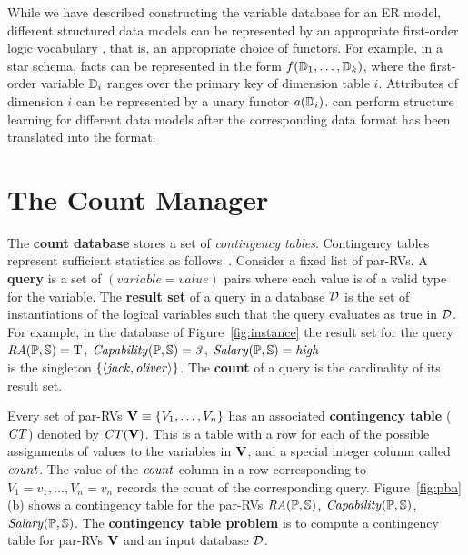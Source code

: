 \documentclass{IEEEtran}
\begin{document}
While we have described constructing the variable database for an ER model, different structured data models can be represented by an appropriate first-order logic vocabulary \cite{Kimmig2015}, that is, an appropriate choice of functors. For example, in a star schema, facts can be represented in the form $\functor(\dimension_{1},\ldots,\dimension_{k})$, where the first-order variable $\dimension_{i}$ ranges over the primary key of dimension table $i$. Attributes of dimension $i$ can be represented by a unary functor $\attribute(\dimension_{i})$. \FB can perform structure learning for different data models after the corresponding data format has been translated into the \RVD format.



\section{The Count Manager} 



The \textbf{count database} \CDB stores a set of  {\em contingency tables}. Contingency tables represent sufficient statistics as follows~\cite{Moore1998}. 
Consider a fixed list of par-RVs.
A \textbf{query} is a set of $(variable = value)$ pairs where each value is of a valid type for the variable. 
The \textbf{result set} of a query in a database $\D$ is the set of instantiations of the logical variables such that the query evaluates as true in $\D$.
For example, in the database of Figure~\ref{fig:instance} the result set for the query\\ 
$\it{RA}(\P,\S) = \true$, $\it{Capability}(\P,\S) = 3$, $\it{Salary}(\P,\S) = \it{high} $\\ is
the singleton $\{\langle \it{jack}, \it{oliver}\rangle\}$. 
The \textbf{count} of a query is the cardinality of its result set. 

Every set of par-RVs $\set{V} \equiv \{\V_{1},\ldots,\V_{n} \}$ has an associated \textbf{contingency table} ($\cttable$) denoted by $\cttable(\set{V})$. %
This is a table with a row for each of the possible assignments of values to the variables in $\set{V}$, and a special integer column called $\qcount$. 
The value of the $\qcount$ column in a row 
corresponding to $V_{1} = v_{1},\ldots,V_{n} = v_{n}$ records the count of the 
corresponding query. 
Figure~\ref{fig:pbn}(b) shows a contingency table for the par-RVs $\it{RA}(\P,\S)$, $\it{Capability}(\P,\S)$, $\it{Salary}(\P,\S)$. The \textbf{contingency table problem} is to compute a contingency table for par-RVs $\set{V} $ and an input database $\D$. 
\end{document}
